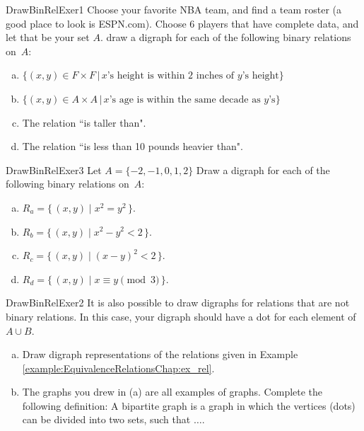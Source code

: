  \begin{exercise}{DrawBinRelExer1}
Choose your favorite NBA team, and find a team roster (a good place to look is ESPN.com). Choose 6 players that have complete data, and let that be your set $A$.  draw a digraph for each of the following binary relations on~$A$: 
 \begin{enumerate}[(a)]
 \item \label{DrawBinRelExer-sister}
 $\{ (x,y) \in F \times F \,|\, x  \text{'s height is within 2 inches of }y\text{'s height} \}$
 \item \label{DrawBinRelExer-son}
 $\{ (x,y) \in A \times A \,|\, x\text{'s age is within the same decade as }y\text{'s}  \}$ 
 \item \label{DrawBinRelExer-married}
 The relation ``is taller than".
  \item \label{DrawBinRelExer-lived}
 The relation ``is less than 10 pounds heavier than".
 \end{enumerate}
 \end{exercise}
 
 \begin{exercise}{DrawBinRelExer3}
Let $A =  \{-2,-1,0,1,2\}$ Draw a digraph for each of the following binary relations on~$A$: 

 \begin{enumerate}[(a)]
 \item \label{DrawBinRelExer-son}
 $R_a = \{\, (x,y) \mid  x^2 = y^2 \,\} .$
 \item \label{DrawBinRelExer-sister}
$ R_b = \{\, (x,y) \mid  x^2 - y^2 < 2 \,\} .$
 \item \label{DrawBinRelExer-married}
 $ R_c = \{\, (x,y) \mid  (x-y)^2 < 2 \,\} .$
  \item \label{DrawBinRelExer-lived}
$ R_d = \{\, (x,y) \mid  x\equiv y \pmod{3} \,\} .$
 \end{enumerate}
 \end{exercise}

 \begin{exercise}{DrawBinRelExer2}
It is also possible to draw digraphs for relations that are not binary relations. In this case, your digraph should have a dot for each element of $A \cup B$.
 \begin{enumerate}[(a)]
 \item \label{DrawBinRelExer-son}
Draw digraph representations of the relations given in Example \ref{example:EquivalenceRelationsChap:ex_rel}.
 \item \label{DrawBinRelExer-sister}
The graphs you drew in (a) are all examples of  graphs.  Complete the following definition:  A bipartite graph is a graph in which the vertices (dots) can be divided into two  sets, such that $\ldots$.
 \end{enumerate}
 \end{exercise}


